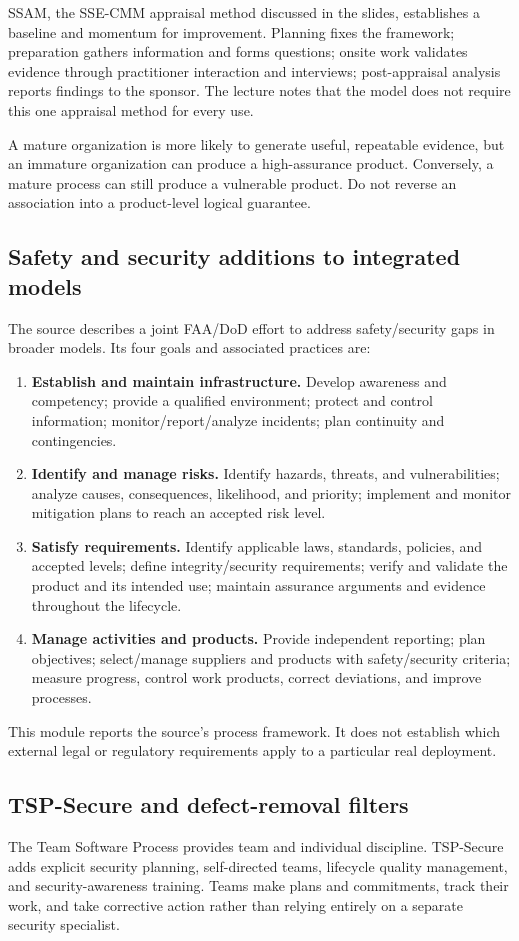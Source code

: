 \documentclass[11pt,a4paper]{article}
\numberwithin{figure}{section}
\begin{document}
SSAM, the SSE-CMM appraisal method discussed in the slides, establishes a baseline and momentum for improvement. Planning fixes the framework; preparation gathers information and forms questions; onsite work validates evidence through practitioner interaction and interviews; post-appraisal analysis reports findings to the sponsor. The lecture notes that the model does not require this one appraisal method for every use.

A mature organization is more likely to generate useful, repeatable evidence, but an immature organization can produce a high-assurance product. Conversely, a mature process can still produce a vulnerable product. Do not reverse an association into a product-level logical guarantee.

\subsection{Safety and security additions to integrated models}
The source describes a joint FAA/DoD effort to address safety/security gaps in broader models. Its four goals and associated practices are:
\begin{enumerate}
\item \textbf{Establish and maintain infrastructure.} Develop awareness and competency; provide a qualified environment; protect and control information; monitor/report/analyze incidents; plan continuity and contingencies.
\item \textbf{Identify and manage risks.} Identify hazards, threats, and vulnerabilities; analyze causes, consequences, likelihood, and priority; implement and monitor mitigation plans to reach an accepted risk level.
\item \textbf{Satisfy requirements.} Identify applicable laws, standards, policies, and accepted levels; define integrity/security requirements; verify and validate the product and its intended use; maintain assurance arguments and evidence throughout the lifecycle.
\item \textbf{Manage activities and products.} Provide independent reporting; plan objectives; select/manage suppliers and products with safety/security criteria; measure progress, control work products, correct deviations, and improve processes.
\end{enumerate}
This module reports the source's process framework. It does not establish which external legal or regulatory requirements apply to a particular real deployment.

\subsection{TSP-Secure and defect-removal filters}
The Team Software Process provides team and individual discipline. TSP-Secure adds explicit security planning, self-directed teams, lifecycle quality management, and security-awareness training. Teams make plans and commitments, track their work, and take corrective action rather than relying entirely on a separate security specialist.
\end{document}
